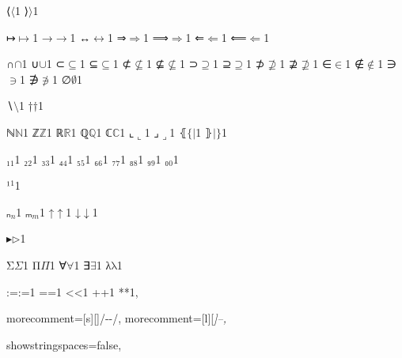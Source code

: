 {%
{⟨}{{\ensuremath{\langle}}}1
{⟩}{{\ensuremath{\rangle}}}1

{↦}{{\ensuremath{\mapsto}}}1
{→}{{\ensuremath{\rightarrow}}}1
{↔}{{\ensuremath{\leftrightarrow}}}1
{⇒}{{\ensuremath{\Rightarrow}}}1
{⟹}{{\ensuremath{\Longrightarrow}}}1
{⇐}{{\ensuremath{\Leftarrow}}}1
{⟸}{{\ensuremath{\Longleftarrow}}}1

{∩}{{\ensuremath{\cap}}}1
{∪}{{\ensuremath{\cup}}}1
{⊂}{{\ensuremath{\subseteq}}}1
{⊆}{{\ensuremath{\subseteq}}}1
{⊄}{{\ensuremath{\nsubseteq}}}1
{⊈}{{\ensuremath{\nsubseteq}}}1
{⊃}{{\ensuremath{\supseteq}}}1
{⊇}{{\ensuremath{\supseteq}}}1
{⊅}{{\ensuremath{\nsupseteq}}}1
{⊉}{{\ensuremath{\nsupseteq}}}1
{∈}{{\ensuremath{\in}}}1
{∉}{{\ensuremath{\notin}}}1
{∋}{{\ensuremath{\ni}}}1
{∌}{{\ensuremath{\notni}}}1
{∅}{{\ensuremath{\emptyset}}}1

{∖}{{\ensuremath{\setminus}}}1
{†}{{\ensuremath{\dag}}}1

{ℕ}{{\ensuremath{\mathbb{N}}}}1
{ℤ}{{\ensuremath{\mathbb{Z}}}}1
{ℝ}{{\ensuremath{\mathbb{R}}}}1
{ℚ}{{\ensuremath{\mathbb{Q}}}}1
{ℂ}{{\ensuremath{\mathbb{C}}}}1
{⌞}{{\ensuremath{\llcorner}}}1
{⌟}{{\ensuremath{\lrcorner}}}1
{⦃}{{\ensuremath{\{\!|}}}1
{⦄}{{\ensuremath{|\!\}}}}1

{₁}{{\ensuremath{_1}}}1
{₂}{{\ensuremath{_2}}}1
{₃}{{\ensuremath{_3}}}1
{₄}{{\ensuremath{_4}}}1
{₅}{{\ensuremath{_5}}}1
{₆}{{\ensuremath{_6}}}1
{₇}{{\ensuremath{_7}}}1
{₈}{{\ensuremath{_8}}}1
{₉}{{\ensuremath{_9}}}1
{₀}{{\ensuremath{_0}}}1

{¹}{{\ensuremath{^1}}}1

{ₙ}{{\ensuremath{_n}}}1
{ₘ}{{\ensuremath{_m}}}1
{↑}{{\ensuremath{\uparrow}}}1
{↓}{{\ensuremath{\downarrow}}}1

{▸}{{\ensuremath{\triangleright}}}1

{Σ}{{\color{symbolcolor}\ensuremath{\Sigma}}}1
{Π}{{\color{symbolcolor}\ensuremath{\Pi}}}1
{∀}{{\color{symbolcolor}\ensuremath{\forall}}}1
{∃}{{\color{symbolcolor}\ensuremath{\exists}}}1
{λ}{{\color{symbolcolor}\ensuremath{\mathrm{\lambda}}}}1

{:=}{{\color{symbolcolor}:=}}1
{=}{{\color{symbolcolor}=}}1
{<}{{\color{symbolcolor}<}}1
{+}{{\color{symbolcolor}+}}1
{*}{{\color{symbolcolor}*}}1,

morecomment=[s][\color{commentcolor}]{/-}{-/},
morecomment=[l][\itshape \color{commentcolor}]{--},

showstringspaces=false,

}
